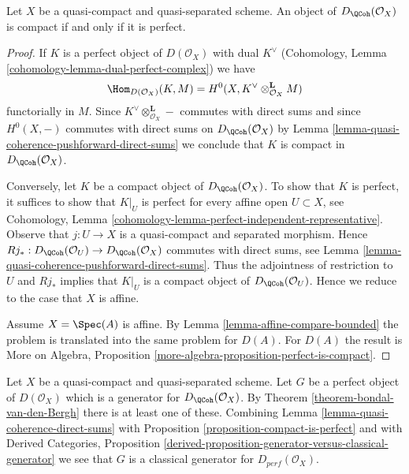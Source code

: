 \begin{proposition}
\label{proposition-compact-is-perfect}
Let $X$ be a quasi-compact and quasi-separated scheme.
An object of $D_\QCoh(\mathcal{O}_X)$ is compact
if and only if it is perfect.
\end{proposition}

\begin{proof}
If $K$ is a perfect object of $D(\mathcal{O}_X)$ with dual
$K^\vee$ (Cohomology, Lemma \ref{cohomology-lemma-dual-perfect-complex})
we have
$$
\Hom_{D(\mathcal{O}_X)}(K, M) =
H^0(X, K^\vee \otimes_{\mathcal{O}_X}^\mathbf{L} M)
$$
functorially in $M$. Since $K^\vee \otimes_{\mathcal{O}_X}^\mathbf{L} -$
commutes with direct sums and since $H^0(X, -)$ commutes with direct
sums on $D_\QCoh(\mathcal{O}_X)$ by
Lemma \ref{lemma-quasi-coherence-pushforward-direct-sums}
we conclude that $K$ is compact in $D_\QCoh(\mathcal{O}_X)$.

\medskip\noindent
Conversely, let $K$ be a compact object of $D_\QCoh(\mathcal{O}_X)$.
To show that $K$ is perfect, it suffices to show that
$K|_U$ is perfect for every affine open $U \subset X$, see
Cohomology, Lemma \ref{cohomology-lemma-perfect-independent-representative}.
Observe that $j : U \to X$ is a quasi-compact and separated morphism.
Hence
$Rj_* : D_\QCoh(\mathcal{O}_U) \to D_\QCoh(\mathcal{O}_X)$
commutes with direct sums, see
Lemma \ref{lemma-quasi-coherence-pushforward-direct-sums}.
Thus the adjointness of restriction to $U$ and $Rj_*$ implies that
$K|_U$ is a compact object of $D_\QCoh(\mathcal{O}_U)$.
Hence we reduce to the case that $X$ is affine.

\medskip\noindent
Assume $X = \Spec(A)$ is affine. By Lemma \ref{lemma-affine-compare-bounded}
the problem is translated into the same problem for $D(A)$.
For $D(A)$ the result is
More on Algebra, Proposition \ref{more-algebra-proposition-perfect-is-compact}.
\end{proof}

\begin{remark}
\label{remark-classical-generator}
Let $X$ be a quasi-compact and quasi-separated scheme. Let $G$ be a
perfect object of $D(\mathcal{O}_X)$ which is a generator for
$D_\QCoh(\mathcal{O}_X)$. By Theorem \ref{theorem-bondal-van-den-Bergh}
there is at least one of these. Combining
Lemma \ref{lemma-quasi-coherence-direct-sums} with
Proposition \ref{proposition-compact-is-perfect} and with
Derived Categories, Proposition
\ref{derived-proposition-generator-versus-classical-generator}
we see that $G$ is a classical generator for $D_{perf}(\mathcal{O}_X)$.
\end{remark}

